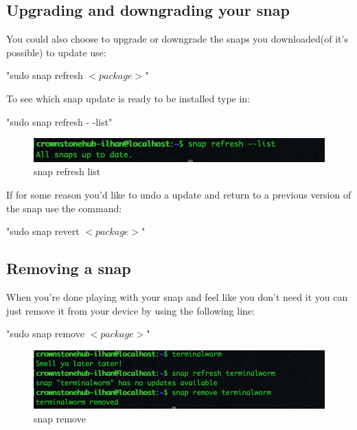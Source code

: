 \documentclass{article}
\begin{document}
\begin{flushleft}
\subsection{Upgrading and downgrading your snap}\label{sec:refresh}
You could also choose to upgrade or downgrade the snaps you downloaded(of it's possible) to update use:\\
			\begin{center}				
			"sudo snap refresh $<package>$"
			\end{center}
			
To see which snap update is ready to be installed type in: 
			\begin{center}				
			"sudo snap refresh - -list"
			\end{center}
\label{fig:snapRefreshList}	
	\begin{figure}[H]
	\includegraphics[width=5in]{snapRefreshList.png}
	\caption[Optional caption]{snap refresh list}
	\end{figure}	
	
If for some reason you'd like to undo a update and return to a previous version of the snap use the command: 
			\begin{center}				
			"sudo snap revert $<package>$"
			\end{center}
\cleardoublepage
\subsection{Removing a snap}\label{sec:remove}			
When you're done playing with your snap and feel like you don't need it you can just remove it from your device by using the following line: 
			\begin{center}				
			"sudo snap remove $<package>$"
			\end{center}
\label{fig:snapRemove}	
	\begin{figure}[H]
	\includegraphics[width=5in]{snapRemove.png}
	\caption[Optional caption]{snap remove}
	\end{figure}	
\bigskip

\end{flushleft}
\end{document}
